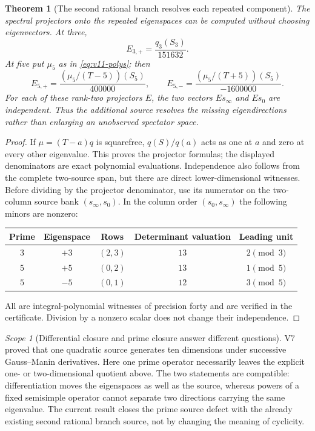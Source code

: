 \documentclass[11pt]{article}
\newtheorem{theorem}{Theorem}[section]
\theoremstyle{definition}
\theoremstyle{remark}
\newtheorem{scope}[scope]{Scope}
\begin{document}
\begin{theorem}[The second rational branch resolves each repeated component]
\label{thm:v11-projectors}
The spectral projectors onto the repeated eigenspaces can be computed
without choosing eigenvectors. At three,
\begin{equation}
 E_{3,+}=\frac{q_3(S_3)}{151632}.
 \label{eq:v11-proj3}
\end{equation}
At five put $\mu_5$ as in \cref{eq:v11-polys}; then
\begin{equation}
 E_{5,+}=\frac{(\mu_5/(T-5))(S_5)}{400000},\qquad
 E_{5,-}=\frac{(\mu_5/(T+5))(S_5)}{-1600000}.
 \label{eq:v11-proj5}
\end{equation}
For each of these rank-two projectors $E$, the two vectors
$Es_\infty$ and $Es_0$ are independent. Thus the additional source
resolves the missing eigendirections rather than enlarging an
unobserved spectator space.
\end{theorem}
\begin{proof}
If $\mu=(T-a)q$ is squarefree, $q(S)/q(a)$ acts as one at $a$ and
zero at every other eigenvalue. This proves the projector formulas;
the displayed denominators are exact polynomial evaluations.
Independence also follows from the complete two-source span, but there
are direct lower-dimensional witnesses. Before dividing by the projector
denominator, use its numerator on the two-column source bank
$(s_\infty,s_0)$. In the column order $(s_0,s_\infty)$ the following
minors are nonzero:
\begin{center}
\begin{tabular}{ccccc}
\toprule
Prime & Eigenspace & Rows & Determinant valuation & Leading unit\\
\midrule
$3$ & $+3$ & $(2,3)$ & $13$ & $2\pmod3$\\
$5$ & $+5$ & $(0,2)$ & $13$ & $1\pmod5$\\
$5$ & $-5$ & $(0,1)$ & $12$ & $3\pmod5$\\
\bottomrule
\end{tabular}
\end{center}
All are integral-polynomial witnesses of precision forty and are
verified in the certificate. Division by a nonzero scalar does not
change their independence.
\end{proof}

\begin{scope}[Differential closure and prime closure answer different questions]
V7 proved that one quadratic source generates ten dimensions under
successive Gauss--Manin derivatives. Here one prime operator necessarily
leaves the explicit one- or two-dimensional quotient above. The two
statements are compatible: differentiation moves the eigenspaces as
well as the source, whereas powers of a fixed semisimple operator cannot
separate two directions carrying the same eigenvalue. The current result
closes the prime source defect with the already existing second rational
branch source, not by changing the meaning of cyclicity.
\end{scope}
\end{document}
